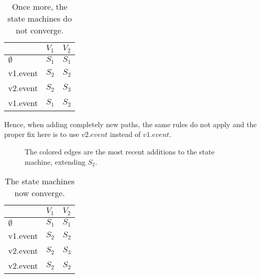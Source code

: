 \documentclass[a4paper]{article}
\begin{document}
\begin{table}[ht]
    \centering
    \begin{tabular}{l|l|l|}
        \cline{2-3}
                                          & $V_1$ & $V_2$ \\ \hline
        \multicolumn{1}{|l|}{$\emptyset$} & $S_1$ & $S_1$ \\ \hline
        \multicolumn{1}{|l|}{v1.event}    & $S_2$ & $S_2$ \\ \hline
        \multicolumn{1}{|l|}{v2.event}    & $S_2$ & $S_3$ \\ \hline
        \multicolumn{1}{|l|}{v1.event}    & $S_1$ & $S_2$ \\ \hline
    \end{tabular}
    \caption{Once more, the state machines do not converge.}
    \label{tab:transition_extension_breakage}
\end{table}

Hence, when adding completely new paths, the same rules do not apply and the proper fix here is to
use $v2.event$ instead of $v1.event$.

\begin{figure}[ht]
    \centering
    \caption{The colored edges are the most recent additions to the state machine, extending $S_2$.}
    \label{fig:fsm_extension_breakage_fixed}
\end{figure}

\begin{table}[ht]
    \centering
    \begin{tabular}{l|l|l|}
        \cline{2-3}
                                          & $V_1$ & $V_2$ \\ \hline
        \multicolumn{1}{|l|}{$\emptyset$} & $S_1$ & $S_1$ \\ \hline
        \multicolumn{1}{|l|}{v1.event}    & $S_2$ & $S_2$ \\ \hline
        \multicolumn{1}{|l|}{v2.event}    & $S_2$ & $S_3$ \\ \hline
        \multicolumn{1}{|l|}{v2.event}    & $S_2$ & $S_2$ \\ \hline
    \end{tabular}
    \caption{The state machines now converge.}
    \label{tab:transition_extension_breakage_fixed}
\end{table}
\end{document}
